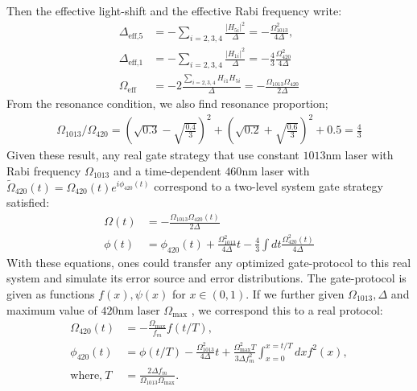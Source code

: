 \documentclass[11pt]{article}
\begin{document}
Then the effective light-shift and the effective Rabi frequency write:
\begin{align}
    \Delta_{\text{eff,5}} &= -\sum_{i = 2,3,4} \frac{|H_{5i}|^2} {\Delta} = -\frac{\Omega_{1013}^2}{4\Delta},\\
     \Delta_{\text{eff,1}} &= -\sum_{i = 2,3,4} \frac{|H_{1i}|^2} {\Delta} =- \frac{4}{3} \frac{\Omega_{420}^2}{4\Delta}\\
    \Omega_{\text{eff}} &= -2\frac{\sum_{i = 2,3,4} H_{i1} H_{5i}}{\Delta} = -\frac{\Omega_{1013}\Omega_{420}}{2\Delta}
\end{align}
From the resonance condition, we also find resonance proportion;
\begin{align}
    \Omega_{1013}/\Omega_{420} = (\sqrt{0.3} - \sqrt{\frac{0.4}{3}})^2+(\sqrt{0.2} + \sqrt{\frac{0.6}{3}})^2 +0.5 = \frac{4}{3}
\end{align}
Given these result, any real gate strategy that use constant $1013\text{nm}$ laser with Rabi frequency $\Omega_{1013}$ and a time-dependent $460\text{nm}$ laser with $\tilde\Omega_{420}(t) = \Omega_{420}(t) e^{i\phi_{420}(t)}$ correspond to a two-level system gate strategy satisfied:
\begin{align}
    \Omega(t) &= -\frac{\Omega_{1013}\Omega_{420}(t)}{2\Delta} \\
    \phi(t) &= \phi_{420}(t) +\frac{\Omega_{\text{1013}}^2}{4\Delta} t - \frac{4}{3} \int dt \frac{\Omega_{\text{420}}^2(t)}{4\Delta}
\end{align}
With these equations, ones could transfer any optimized gate-protocol to this real system and simulate its error source and error distributions. The gate-protocol is given as functions $f(x),\psi(x)$  for $x\in (0,1)$. If we further given $\Omega_{1013}, \Delta$ and maximum value of $420\text{nm}$ laser $\Omega_{\text{max}}$ , we correspond this to a real protocol:
\begin{align}
    \Omega_{420}(t) &= - \frac{\Omega_{\max}}{f_m} f(t/T), \\
    \phi_{420}(t) &= \phi(t/T) - \frac{\Omega_{1013}^2}{4\Delta} t + \frac{\Omega_{\max}^2 T}{3\Delta f_m^2}\int_{x = 0}^{x =  t/T} dx f^2(x), \\
    \text{where,}~ T &= \frac{2\Delta f_m}{\Omega_{1013} \Omega_{\max}}.
\end{align}
\end{document}
